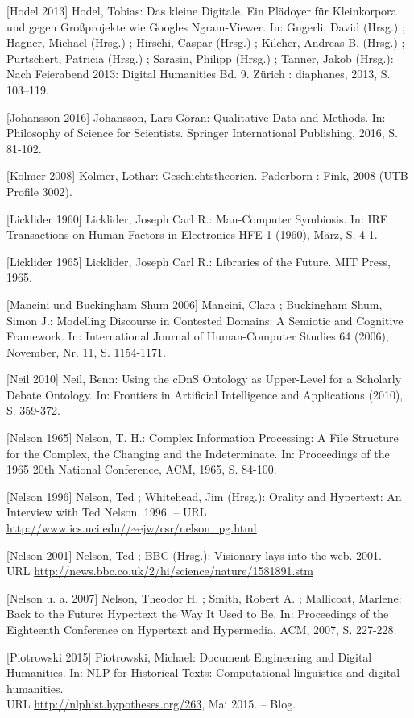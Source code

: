 \documentclass[a4paper,
fontsize=11pt,
oneside,
numbers=noperiodatend,
parskip=half-,
bibliography=totoc,
final
]{scrartcl}
\begin{document}
{[}Hodel 2013{]} Hodel, Tobias: Das kleine Digitale. Ein Plädoyer für
Kleinkorpora und gegen Großprojekte wie Googles Ngram-Viewer. In:
Gugerli, David (Hrsg.) ; Hagner, Michael (Hrsg.) ; Hirschi, Caspar
(Hrsg.) ; Kilcher, Andreas B. (Hrsg.) ; Purtschert, Patricia (Hrsg.) ;
Sarasin, Philipp (Hrsg.) ; Tanner, Jakob (Hrsg.): Nach Feierabend 2013:
Digital Humanities Bd. 9. Zürich : diaphanes, 2013, S. 103--119.

{[}Johansson 2016{]} Johansson, Lars-Göran: Qualitative Data and
Methods. In: Philosophy of Science for Scientists. Springer
International Publishing, 2016, S. 81-102.

{[}Kolmer 2008{]} Kolmer, Lothar: Geschichtstheorien. Paderborn : Fink,
2008 (UTB Profile 3002).

{[}Licklider 1960{]} Licklider, Joseph Carl R.: Man-Computer Symbiosis.
In: IRE Transactions on Human Factors in Electronics HFE-1 (1960), März,
S. 4-1.

{[}Licklider 1965{]} Licklider, Joseph Carl R.: Libraries of the Future.
MIT Press, 1965.

{[}Mancini und Buckingham Shum 2006{]} Mancini, Clara ; Buckingham Shum,
Simon J.: Modelling Discourse in Contested Domains: A Semiotic and
Cognitive Framework. In: International Journal of Human-Computer Studies
64 (2006), November, Nr. 11, S. 1154-1171.

{[}Neil 2010{]} Neil, Benn: Using the cDnS Ontology as Upper-Level for a
Scholarly Debate Ontology. In: Frontiers in Artificial Intelligence and
Applications (2010), S. 359-372.

{[}Nelson 1965{]} Nelson, T. H.: Complex Information Processing: A File
Structure for the Complex, the Changing and the Indeterminate. In:
Proceedings of the 1965 20th National Conference, ACM, 1965, S. 84-100.

{[}Nelson 1996{]} Nelson, Ted ; Whitehead, Jim (Hrsg.): Orality and
Hypertext: An Interview with Ted Nelson. 1996. -- URL
\url{http://www.ics.uci.edu//~ejw/csr/nelson_pg.html}

{[}Nelson 2001{]} Nelson, Ted ; BBC (Hrsg.): Visionary lays into the
web. 2001. -- URL
\url{http://news.bbc.co.uk/2/hi/science/nature/1581891.stm}

{[}Nelson u. a. 2007{]} Nelson, Theodor H. ; Smith, Robert A. ;
Mallicoat, Marlene: Back to the Future: Hypertext the Way It Used to Be.
In: Proceedings of the Eighteenth Conference on Hypertext and
Hypermedia, ACM, 2007, S. 227-228.

{[}Piotrowski 2015{]} Piotrowski, Michael: Document Engineering and
Digital Humanities. In: NLP for Historical Texts: Computational
linguistics and digital humanities. \\ URL 
\url{http://nlphist.hypotheses.org/263}, Mai 2015. -- Blog.
\end{document}
